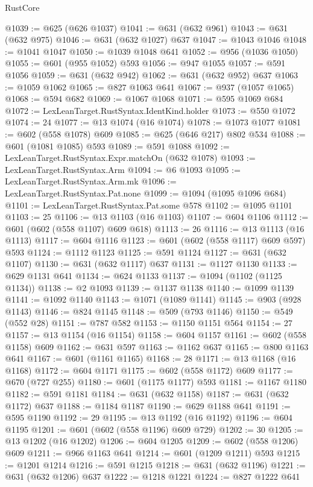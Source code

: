 \begin{lexlean}{RustCore}
\begin{coremodule}
@1039 := @625 (@626 @1037)
@1041 := @631 (@632 @961)
@1043 := @631 (@632 @975)
@1046 := @631 (@632 @1027) @637
@1047 := @1043 @1046
@1048 := @1041 @1047
@1050 := @1039 @1048 @641
@1052 := @956 (@1036 @1050)
@1055 := @601 (@955 @1052) @593
@1056 := @947 @1055
@1057 := @591 @1056
@1059 := @631 (@632 @942)
@1062 := @631 (@632 @952) @637
@1063 := @1059 @1062
@1065 := @827 @1063 @641
@1067 := @937 (@1057 @1065)
@1068 := @594 @682
@1069 := @1067 @1068
@1071 := @595 @1069 @684
@1072 := LexLeanTarget.RustSyntax.IdentKind.holder
@1073 := @550 @1072
@1074 := 24
@1077 := @13 @1074 (@16 @1074)
@1078 := @1073 @1077
@1081 := @602 (@558 @1078) @609
@1085 := @625 (@646 @217) @802 @534
@1088 := @601 (@1081 @1085) @593
@1089 := @591 @1088
@1092 := LexLeanTarget.RustSyntax.Expr.matchOn (@632 @1078)
@1093 := LexLeanTarget.RustSyntax.Arm
@1094 := @6 @1093
@1095 := LexLeanTarget.RustSyntax.Arm.mk
@1096 := LexLeanTarget.RustSyntax.Pat.none
@1099 := @1094 (@1095 @1096 @684)
@1101 := LexLeanTarget.RustSyntax.Pat.some @578
@1102 := @1095 @1101
@1103 := 25
@1106 := @13 @1103 (@16 @1103)
@1107 := @604 @1106
@1112 := @601 (@602 (@558 @1107) @609 @618)
@1113 := 26
@1116 := @13 @1113 (@16 @1113)
@1117 := @604 @1116
@1123 := @601 (@602 (@558 @1117) @609 @597) @593
@1124 := @1112 @1123
@1125 := @591 @1124
@1127 := @631 (@632 @1107)
@1130 := @631 (@632 @1117) @637
@1131 := @1127 @1130
@1133 := @629 @1131 @641
@1134 := @624 @1133
@1137 := @1094 (@1102 (@1125 @1134))
@1138 := @2 @1093
@1139 := @1137 @1138
@1140 := @1099 @1139
@1141 := @1092 @1140
@1143 := @1071 (@1089 @1141)
@1145 := @903 (@928 @1143)
@1146 := @824 @1145
@1148 := @509 (@793 @1146)
@1150 := @549 (@552 @28)
@1151 := @787 @582
@1153 := @1150 @1151 @564
@1154 := 27
@1157 := @13 @1154 (@16 @1154)
@1158 := @604 @1157
@1161 := @602 (@558 @1158) @609
@1162 := @631 @597
@1163 := @1162 @637
@1165 := @800 @1163 @641
@1167 := @601 (@1161 @1165)
@1168 := 28
@1171 := @13 @1168 (@16 @1168)
@1172 := @604 @1171
@1175 := @602 (@558 @1172) @609
@1177 := @670 (@727 @255)
@1180 := @601 (@1175 @1177) @593
@1181 := @1167 @1180
@1182 := @591 @1181
@1184 := @631 (@632 @1158)
@1187 := @631 (@632 @1172) @637
@1188 := @1184 @1187
@1190 := @629 @1188 @641
@1191 := @595 @1190
@1192 := 29
@1195 := @13 @1192 (@16 @1192)
@1196 := @604 @1195
@1201 := @601 (@602 (@558 @1196) @609 @729)
@1202 := 30
@1205 := @13 @1202 (@16 @1202)
@1206 := @604 @1205
@1209 := @602 (@558 @1206) @609
@1211 := @966 @1163 @641
@1214 := @601 (@1209 @1211) @593
@1215 := @1201 @1214
@1216 := @591 @1215
@1218 := @631 (@632 @1196)
@1221 := @631 (@632 @1206) @637
@1222 := @1218 @1221
@1224 := @827 @1222 @641

\end{coremodule}
\end{lexlean}
